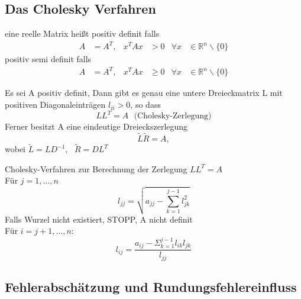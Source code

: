 \documentclass[
	ngerman,
	accentcolor=9c,%
	type=intern,
	marginpar=false
	]{tudapub}
\begin{document}
    \subsection{Das Cholesky Verfahren}
    \begin{definition}
        eine reelle Matrix heißt positiv definit falls
        \begin{align*}
            A&=A^T, & x^TAx &>0 & \forall x &\in \mathbb{R}^n \backslash \{0\}
        \end{align*}
        positiv semi definit falls
        \begin{align*}
            A&=A^T, & x^TAx &\geq 0 & \forall x &\in \mathbb{R}^n \backslash \{0\}
        \end{align*}
    \end{definition}
    \begin{satz}
        Es sei A positiv definit, Dann gibt es genau eine untere Dreieckmatrix L mit positiven Diagonaleinträgen $l_{ii} > 0$, so dass
        \begin{equation*}
            LL^T = A \mbox{ } \text{(Cholesky-Zerlegung)}
        \end{equation*}
        Ferner besitzt A eine eindeutige Dreieckszerlegung
        \begin{equation*}
            \tilde{L}\tilde{R}= A,
        \end{equation*}
        wobei $\tilde{L} = LD^{-1}, \mbox{ } \tilde{R} = DL^T$
    \end{satz}
    \begin{satz}
        Cholesky-Verfahren zur Berechnung der Zerlegung $LL^T = A$\\
        Für $j= 1,\dots ,n$
        \begin{equation*}
            l_{jj} =\sqrt{a_{jj}-\sum^{j-1}_{k=1}l_{jk}^2}
        \end{equation*}
        Falls Wurzel nicht existiert, STOPP, A nicht definit\\
        \hspace{20mm} Für $i=j+1,\dots,n:$
        \begin{equation*}
            l_{ij} = \dfrac{a_{ij}-\Sigma_{k=1}^{j-1}l_{ik}l_{jk}}{l_{jj}}
        \end{equation*}
    \end{satz}
    \subsection{Fehlerabschätzung und Rundungsfehlereinfluss}
\end{document}
